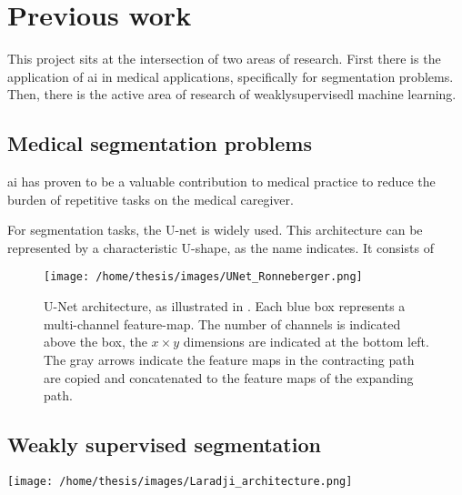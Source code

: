 \chapter{Previous work}

This project sits at the intersection of two areas of research. 
First there is the application of \Gls{ai} in medical applications, specifically for segmentation problems.
Then, there is the active area of research of \Gls{weaklysupervisedl} machine learning.

\section{Medical segmentation problems}

\Gls{ai} has proven to be a valuable contribution to medical practice to reduce the burden of repetitive tasks on the medical caregiver.


For segmentation tasks, the U-net \cite{Ronneberger2015} is widely used. 
This architecture can be represented by a characteristic U-shape, as the name indicates.
It consists of 

\begin{SCfigure}[][htb]
    \texttt{[image: /home/thesis/images/UNet\_Ronneberger.png]}
    \caption{U-Net architecture, as illustrated in \cite{Ronneberger2015}. 
    Each blue box represents a multi-channel feature-map. 
    The number of channels is indicated above the box, the $x \times y$ dimensions are indicated at the bottom left.
    The gray arrows indicate the feature maps in the contracting path are copied and concatenated to the feature maps of the expanding path.}
    \label{fig:unet}
\end{SCfigure}



\section{Weakly supervised segmentation}

\texttt{[image: /home/thesis/images/Laradji\_architecture.png]}
\label{fig:laradji}